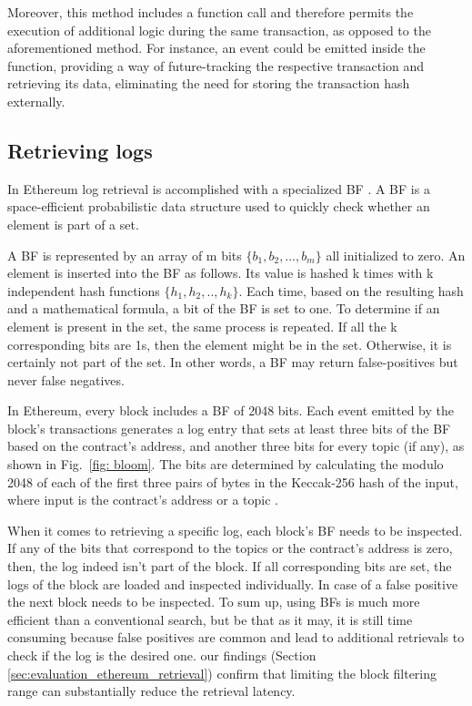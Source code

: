 
Moreover, this method includes a function call and therefore permits the execution of additional logic during the same transaction, as opposed to the aforementioned method. For instance, an event could be emitted inside the function, providing a way of future-tracking the respective transaction and retrieving its data, eliminating the need for storing the transaction hash externally.

\subsection{Retrieving logs}\label{subsection:}
In Ethereum log retrieval is accomplished with a specialized BF  \citep{wood_2014}. A BF  \citep{broder_2004} is a space-efficient probabilistic data structure used to quickly check whether an element is part of a set. 

A BF is represented by an array of m bits $\{b_1, b_2,…, b_m\}$ all initialized to zero. An element is inserted into the BF as follows. Its value is hashed k times with k independent hash functions $\{h_1, h_2,.., h_k\}$. Each time, based on the resulting hash and a mathematical formula, a bit of the BF is set to one. To determine if an element is present in the set, the same process is repeated. If all the k corresponding bits are 1s, then the element might be in the set. Otherwise, it is certainly not part of the set. In other words, a BF may return false-positives but never false negatives.

In Ethereum, every block includes a BF of 2048 bits. Each event emitted by the block’s transactions generates a log entry that sets at least three bits of the BF based on the contract’s address, and another three bits for every topic (if any), as shown in Fig.~\ref{fig: bloom}. The bits are determined by calculating the modulo 2048 of each of the first three pairs of bytes in the Keccak-256 hash of the input, where input is the contract’s address or a topic  \citep{wood_2014}.

When it comes to retrieving a specific log, each block’s BF needs to be inspected. If any of the bits that correspond to the topics or the contract’s address is zero, then, the log indeed isn’t part of the block. If all corresponding bits are set, the logs of the block are loaded and inspected individually. In case of a false positive the next block needs to be inspected.
To sum up, using BFs is much more efficient than a conventional search, but be that as it may, it is still time consuming because false positives are common and lead to additional retrievals to check if the log is the desired one.  our findings (Section \ref{sec:evaluation_ethereum_retrieval}) confirm that limiting the block filtering range can substantially reduce the retrieval latency.

